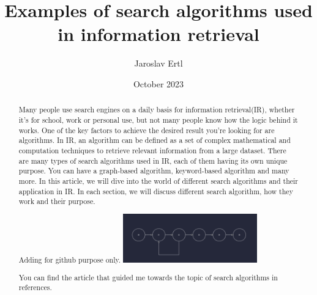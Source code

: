 \documentclass{article}
\title{\textbf{Examples of search algorithms used in information retrieval}}
\author{Jaroslav Ertl}
\date{October 2023}
\begin{document}
\maketitle
 
\begin{abstract}
    Many people use search engines on a daily basis for information retrieval(IR), whether it's for school, work or personal use, but not many people know how the logic behind it works. One of the key factors to achieve the desired result you're looking for are algorithms. In IR, an algorithm can be defined as a set of complex mathematical and computation techniques to retrieve relevant information from a large dataset. There are many types of search algorithms used in IR, each of them having its own unique purpose. You can have a graph-based algorithm, keyword-based algorithm and many more. In this article, we will dive into the world of different search algorithms and their application in IR. In each section, we will discuss different search algorithm, how they work and their purpose.
    
    Adding for github purpose only.
  \centering
  \includegraphics[width=0.48\textwidth]{UmletDiagram.png} %

You can find the article that guided me towards the topic of search algorithms in references.\cite{10210566}
\end{abstract}


 
\cite{Chonyy}
\end{document}
